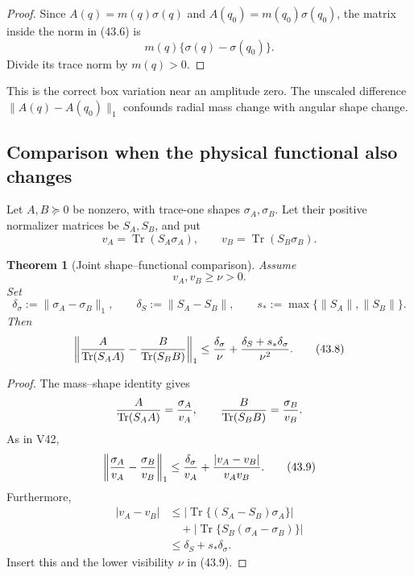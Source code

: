 \documentclass[11pt]{article}
\newtheorem{theorem}{Theorem}[section]
\theoremstyle{remark}
\begin{document}
\begin{proof}
Since \(A(q)=m(q)\sigma(q)\) and
\(A(q_0)=m(q_0)\sigma(q_0)\), the matrix inside the norm in
(43.6) is
\[
 m(q)\{\sigma(q)-\sigma(q_0)\}.
\]
Divide its trace norm by \(m(q)>0\).
\end{proof}

This is the correct box variation near an amplitude zero.  The
unscaled difference \(\|A(q)-A(q_0)\|_1\) confounds radial mass
change with angular shape change.

\subsection{Comparison when the physical functional also changes}

Let \(A,B\succeq0\) be nonzero, with trace-one shapes
\(\sigma_A,\sigma_B\).  Let their positive normalizer matrices be
\(S_A,S_B\), and put
\[
 v_A=\operatorname{Tr}(S_A\sigma_A),\qquad
 v_B=\operatorname{Tr}(S_B\sigma_B).
\]

\begin{theorem}[Joint shape--functional comparison]
\label{thm:v12v43-joint}
Assume
\[
 v_A,v_B\geq\nu>0.
\]
Set
\[
 \delta_\sigma:=\|\sigma_A-\sigma_B\|_1,\qquad
 \delta_S:=\|S_A-S_B\|,\qquad
 s_*:=\max\{\|S_A\|,\|S_B\|\}.
\]
Then
\begin{equation}
 \left\|
 {A\over\operatorname{Tr}(S_AA)}
 -
 {B\over\operatorname{Tr}(S_BB)}
 \right\|_1
 \leq
 {\delta_\sigma\over\nu}
 +
 {\delta_S+s_*\delta_\sigma\over\nu^2}.          \tag{43.8}
\end{equation}
\end{theorem}

\begin{proof}
The mass--shape identity gives
\[
 {A\over\operatorname{Tr}(S_AA)}
 =
 {\sigma_A\over v_A},
 \qquad
 {B\over\operatorname{Tr}(S_BB)}
 =
 {\sigma_B\over v_B}.
\]
As in V42,
\begin{equation}
 \left\|{\sigma_A\over v_A}
       -{\sigma_B\over v_B}\right\|_1
 \leq
 {\delta_\sigma\over v_A}
 +
 {|v_A-v_B|\over v_Av_B}.                       \tag{43.9}
\end{equation}
Furthermore,
\begin{align*}
 |v_A-v_B|
 &\leq
 |\operatorname{Tr}\{(S_A-S_B)\sigma_A\}|\\
 &\quad+
 |\operatorname{Tr}\{S_B(\sigma_A-\sigma_B)\}|\\
 &\leq\delta_S+s_*\delta_\sigma.
\end{align*}
Insert this and the lower visibility \(\nu\) in (43.9).
\end{proof}
\end{document}
